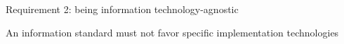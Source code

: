 \begin{frame}
  \epigraph{\huge Requirement 2: being information technology-agnostic}{An information standard must not favor specific implementation technologies}
\end{frame}
